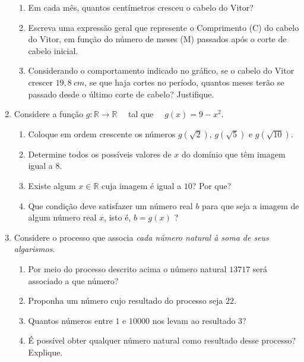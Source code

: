 \begin{enumerate}
\begin{enumerate}
\item {} 
Em cada mês, quantos centímetros cresceu o cabelo do Vitor?

\item {} 
Escreva uma expressão geral que represente o Comprimento (C) do cabelo do Vitor, em função do número de meses (M) passados após o corte de cabelo inicial.

\item {} 
Considerando o comportamento indicado no gráfico, se o cabelo do Vitor crescer \(19,8 \ cm\), se que haja cortes no período, quantos meses terão se passado desde o último corte de cabelo? Justifique.

\end{enumerate}

\item Considere a função \(g:\mathbb{R}\to\mathbb{R}\quad\) tal que \(\quad g(x)=9-x^2\).
\begin{enumerate}
\item {} 
Coloque em ordem crescente os números \(g(\sqrt{2})\), \(g(\sqrt{5})\) e  \(g(\sqrt{10})\).

\item {} 
Determine todos os possíveis valores de \(x\) do domínio que têm imagem igual a 8.

\item {} 
Existe algum \(x\in \mathbb{R}\) cuja imagem é igual a $10$? Por que?

\item {} 
Que condição deve satisfazer um número real \(b\) para que seja a imagem de algum número real \(x\), isto é, \(b=g(x)\) ?

\end{enumerate}

\item Considere o processo que associa \emph{cada número natural à soma de seus algarismos}.
\begin{enumerate}
\item {} 
Por meio do processo descrito acima o número natural \(13717\) será associado a que número?

\item {} 
Proponha um número cujo resultado do processo seja \(22\).

\item {} 
Quantos números entre \(1\) e \(10000\) nos levam ao resultado \(3\)?

\item {} 
É possível obter qualquer número natural como resultado desse processo? Explique.

\end{enumerate}
\end{enumerate}


